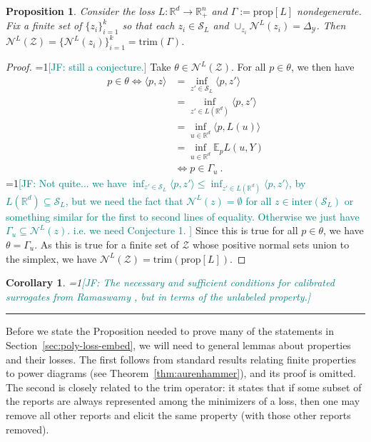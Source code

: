 \documentclass[11pt]{article}
\newcommand{\Comments}{1}
\newcommand{\mynote}[2]{\ifnum\Comments=1\textcolor{#1}{#2}\fi}
\newcommand{\jessie}[1]{\mynote{teal}{[JF: #1]}}
\newcommand{\reals}{\mathbb{R}}
\newcommand{\prop}[1]{\mathrm{prop}[#1]}
\newcommand{\simplex}{\Delta_\Y}
\newcommand{\E}{\mathbb{E}}
\newcommand{\N}{\mathcal{N}}
\newcommand{\Sc}{\mathcal{S}}
\newcommand{\Y}{\mathcal{Y}}
\newcommand{\inprod}[2]{\langle #1, #2 \rangle}%
\newcommand{\inter}{\mathrm{inter}}
\newcommand{\trim}{\mathrm{trim}}
\newtheorem{proposition}{Proposition}
\newtheorem{corollary}{Corollary}
\begin{document}
\begin{proposition}
	Consider the loss $L:\reals^d \to \reals^n_+$ and $\Gamma := \prop{L}$ nondegenerate.
	Fix a finite set of $\{z_i\}_{i=1}^k$ so that each $z_i \in \Sc_L$ and $\cup_{z_i} \N^L(z_i) = \simplex$.
	Then $\N^L(\mathcal{Z}) = \{\N^L(z_i)\}_{i=1}^k = \trim(\Gamma)$.
\end{proposition}
\begin{proof}
  \jessie{still a conjecture.}
  Take $\theta \in \N^L(\mathcal{Z})$.
  For all $p \in \theta$, we then have 
  \begin{align*}
  p \in \theta \iff \inprod{p}{z} &= \inf_{z' \in \Sc_L} \inprod{p}{z'}\\
  &= \inf_{z' \in L(\reals^d)} \inprod{p}{z'}\\
  &= \inf_{u \in \reals^d} \inprod{p}{L(u)}\\
  &= \inf_{u\in \reals^d} \E_p L(u, Y)\\
  &\iff p \in \Gamma_u~.~
  \end{align*}
  \jessie{Not quite... we have $\inf_{z' \in \Sc_L} \inprod{p}{z'} \leq \inf_{z' \in L(\reals^d)} \inprod{p}{z'}$, by $L(\reals^d) \subseteq \Sc_L$, but we need the fact that $\N^L(z) = \emptyset$ for all $z \in \inter(\Sc_L)$ or something similar for the first to second lines of equality.  Otherwise we just have $\Gamma_u \subseteq \N^L(z)$.  i.e. we need Conjecture 1.
  }
  Since this is true for all $p \in \theta$, we have $\theta = \Gamma_u$.
  As this is true for a finite set of $\mathcal{Z}$ whose positive normal sets union to the simplex, we have $\N^L(\mathcal{Z}) = \trim(\prop{L})$.
\end{proof}

\begin{corollary}
	\jessie{The necessary and sufficient conditions for calibrated surrogates from Ramaswamy \cite{ramaswamy2016convex}, but in terms of the unlabeled property.}
\end{corollary}
\hrule

Before we state the Proposition needed to prove many of the statements in Section~\ref{sec:poly-loss-embed}, we will need to general lemmas about properties and their losses.
The first follows from standard results relating finite properties to power diagrams (see Theorem~\ref{thm:aurenhammer}), and its proof is omitted.
The second is closely related to the trim operator: it states that if some subset of the reports are always represented among the minimizers of a loss, then one may remove all other reports and elicit the same property (with those other reports removed).
\end{document}
